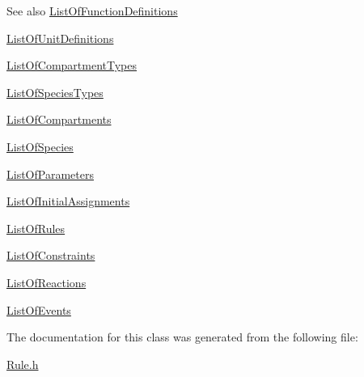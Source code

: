 \begin{DoxySeeAlso}{See also}
\hyperlink{class_list_of_function_definitions}{List\+Of\+Function\+Definitions} 

\hyperlink{class_list_of_unit_definitions}{List\+Of\+Unit\+Definitions} 

\hyperlink{class_list_of_compartment_types}{List\+Of\+Compartment\+Types} 

\hyperlink{class_list_of_species_types}{List\+Of\+Species\+Types} 

\hyperlink{class_list_of_compartments}{List\+Of\+Compartments} 

\hyperlink{class_list_of_species}{List\+Of\+Species} 

\hyperlink{class_list_of_parameters}{List\+Of\+Parameters} 

\hyperlink{class_list_of_initial_assignments}{List\+Of\+Initial\+Assignments} 

\hyperlink{class_list_of_rules}{List\+Of\+Rules} 

\hyperlink{class_list_of_constraints}{List\+Of\+Constraints} 

\hyperlink{class_list_of_reactions}{List\+Of\+Reactions} 

\hyperlink{class_list_of_events}{List\+Of\+Events} 
\end{DoxySeeAlso}


The documentation for this class was generated from the following file\+:\begin{DoxyCompactItemize}
\item 
\hyperlink{_rule_8h}{Rule.\+h}\end{DoxyCompactItemize}

